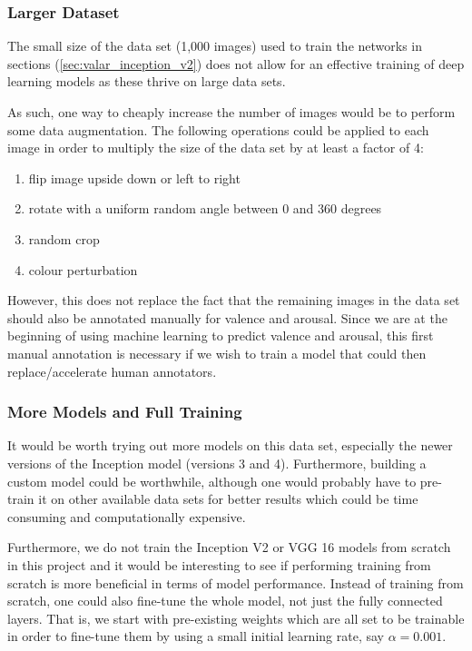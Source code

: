 \documentclass[12pt,twoside]{article}
\begin{document}
\subsubsection{Larger Dataset}

The small size of the data set (1,000 images) used to train the networks in
sections (\ref{sec:valar_inception_v2}) does not
allow for an effective training of deep learning models as these thrive on
large data sets. 

As such, one way to cheaply increase the number of images would be to perform
some data augmentation. The following operations could be applied to each image
in order to multiply the size of the data set by at least a factor of 4:

\begin{enumerate}
  \item flip image upside down or left to right
  \item rotate with a uniform random angle between 0 and 360 degrees
  \item random crop
  \item colour perturbation
\end{enumerate}


However, this does not replace the fact that the remaining images in the
data set should also be annotated manually for valence and arousal. Since we
are at the beginning of using machine learning to predict valence and arousal,
this first manual annotation is necessary if we wish to train a model that
could then replace/accelerate human annotators.

\subsubsection{More Models and Full Training}

It would be worth trying out more models on this data set, especially the
newer versions of the Inception model (versions 3 and 4). Furthermore, building
a custom model could be worthwhile, although one would probably have to
pre-train it on other available data sets for better results which could be
time consuming and computationally expensive. 

Furthermore, we do not train the Inception V2 or VGG 16 models from scratch in
this project and it would be interesting to see if performing training from
scratch is more beneficial in terms of model performance. Instead of training
from scratch, one could also fine-tune the whole model, not just the fully
connected layers. That is, we start with pre-existing weights which are all set
to be trainable in order to fine-tune them by using a small initial learning
rate, say $\alpha=0.001$.
\end{document}
